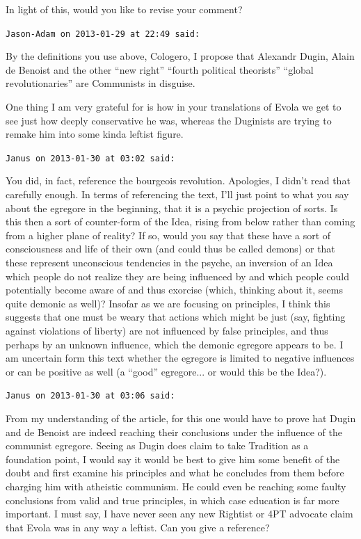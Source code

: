 \begin{footnotesize}
\begin{sffamily}
In light of this, would you like to revise your comment?

\hfill

\texttt{Jason-Adam on 2013-01-29 at 22:49 said:}

By the definitions you use above, Cologero, I propose that Alexandr Dugin, Alain de Benoist and the other ``new right'' ``fourth political theorists'' ``global revolutionaries'' are Communists in disguise.

One thing I am very grateful for is how in your translations of Evola we get to see just how deeply conservative he was, whereas the Duginists are trying to remake him into some kinda leftist figure.

\hfill

\texttt{Janus on 2013-01-30 at 03:02 said:}

You did, in fact, reference the bourgeois revolution. Apologies, I didn't read that carefully enough. In terms of referencing the text, I'll just point to what you say about the egregore in the beginning, that it is a psychic projection of sorts. Is this then a sort of counter-form of the Idea, rising from below rather than coming from a higher plane of reality? If so, would you say that these have a sort of consciousness and life of their own (and could thus be called demons) or that these represent unconscious tendencies in the psyche, an inversion of an Idea which people do not realize they are being influenced by and which people could potentially become aware of and thus exorcise (which, thinking about it, seems quite demonic as well)? Insofar as we are focusing on principles, I think this suggests that one must be weary that actions which might be just (say, fighting against violations of liberty) are not influenced by false principles, and thus perhaps by an unknown influence, which the demonic egregore appears to be. I am uncertain form this text whether the egregore is limited to negative influences or can be positive as well (a ``good'' egregore... or would this be the Idea?).

\hfill

\texttt{Janus on 2013-01-30 at 03:06 said:}

From my understanding of the article, for this one would have to prove hat Dugin and de Benoist are indeed reaching their conclusions under the influence of the communist egregore. Seeing as Dugin does claim to take Tradition as a foundation point, I would say it would be best to give him some benefit of the doubt and first examine his principles and what he concludes from them before charging him with atheistic communism. He could even be reaching some faulty conclusions from valid and true principles, in which case education is far more important. I must say, I have never seen any new Rightist or 4PT advocate claim that Evola was in any way a leftist. Can you give a reference?


\end{sffamily}
\end{footnotesize}
